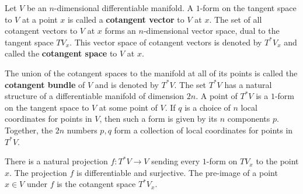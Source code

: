 Let $V$ be an $n$-dimensional differentiable manifold. A $1$-form on the tangent space to $V$ at a point $x$ is called a \textbf{cotangent vector} to $V$ at $x$. The set of all cotangent vectors to $V$ at $x$ forms an $n$-dimensional vector space, dual to the tangent space $TV_x$. This vector space of cotangent vectors is denoted by $T^*V_x$ and called the \textbf{cotangent space} to $V$ at $x$.

The union of the cotangent spaces to the manifold at all of its points is called the \textbf{cotangent bundle} of $V$ and is denoted by $T^*V$. The set $T^*V$ has a natural structure of a differentiable manifold of dimension $2n$. A point of $T^*V$ is a $1$-form on the tangent space to $V$ at some point of $V$. If $q$ is a choice of $n$ local coordinates for points in $V$, then such a form is given by its $n$ components $p$. Together, the $2n$ numbers $p, q$ form a collection of local coordinates for points in $T^*V$.

There is a natural projection $f: T^*V \to V$ sending every $1$-form on $TV_x$ to the point $x$. The projection $f$ is differentiable and surjective. The pre-image of a point $x \in V$ under $f$ is the cotangent space $T^*V_x$.
